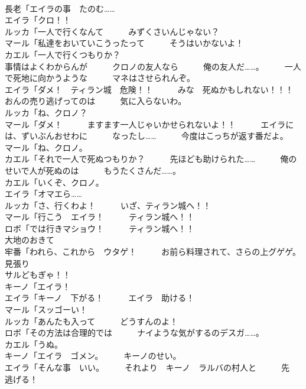 \documentclass[8pt]{extreport}
\begin{document}
\begin{CJK}{UTF8}{min}
\\	長老「エイラの事　たのむ……	
\\	エイラ「クロ！！	
\\	ルッカ「一人で行くなんて　　　みずくさいんじゃない？	
\\	マール「私達をおいていこうったって　　　そうはいかないよ！	
\\	カエル「一人で行くつもりか？	
\\	事情はよくわからんが　　　クロノの友人なら　　　俺の友人だ……。　　　一人で死地に向かうような　　　マネはさせられんぞ。	
\\	エイラ「ダメ！　ティラン城　危険！！　　　みな　死ぬかもしれない！！！	
\\	おんの売り逃げってのは　　　気に入らないわ。	
\\	ルッカ「ね、クロノ？	
\\	マール「ダメ！　　　ますます一人じゃいかせられないよ！！　　　エイラには、ずいぶんおせわに　　　なったし……　　　今度はこっちが返す番だよ。	
\\	マール「ね、クロノ。	
\\	カエル「それで一人で死ぬつもりか？　　　先ほども助けられた……　　　俺のせいで人が死ぬのは　　　もうたくさんだ……。	
\\	カエル「いくぞ、クロノ。	
\\	エイラ「オマエら……	
\\	ルッカ「さ、行くわよ！　　　いざ、ティラン城へ！！	
\\	マール「行こう　エイラ！　　　ティラン城へ！！	
\\	ロボ「では行きマショウ！　　　ティラン城へ！！	
\\	大地のおきて	
\\	牢番「われら、これから　ウタゲ！　　　お前ら料理されて、さらの上グゲゲ。	
\\	見張り
\\	サルどもぎゃ！！	
\\	キーノ「エイラ！	
\\	エイラ「キーノ　下がる！　　　エイラ　助ける！	
\\	マール「スッゴーい！	
\\	ルッカ「あんたも入って　　　どうすんのよ！	
\\	ロボ「その方法は合理的では　　　ナイような気がするのデスガ……。	
\\	カエル「うぬ。	
\\	キーノ「エイラ　ゴメン。　　　キーノのせい。	
\\	エイラ「そんな事　いい。　　　それより　キーノ　ラルバの村人と　　　先　逃げる！	

\end{CJK}
\end{document}
